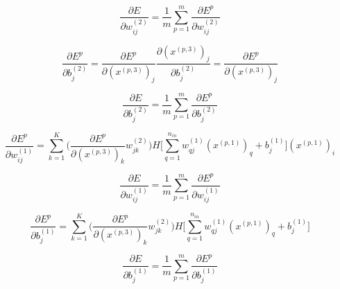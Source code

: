 \documentclass[a4paper,11pt,oneside,roman]{article}
\begin{document}
    \begin{equation}
        \frac{\partial E}{\partial w_{ij}^{(2)}} = \frac{1}{m} \sum\limits_{p=1}^{m} \frac{\partial E^p}{\partial w_{ij}^{(2)}}
    \end{equation}

    \begin{equation}
        \frac{\partial E^p}{\partial b_j^{(2)}} = \frac{\partial E^p}{\partial (x^{(p,3)})_{j}} \frac{\partial (x^{(p,3)})_{j}}{\partial b_{j}^{(2)}} = \frac{\partial E^p}{\partial (x^{(p,3)})_{j}}
    \end{equation}

    \begin{equation}
        \frac{\partial E}{\partial b_{j}^{(2)}} = \frac{1}{m} \sum\limits_{p=1}^{m} \frac{\partial E^p}{\partial b_{j}^{(2)}}
    \end{equation}

    \begin{equation}
        \frac{\partial E^p}{\partial w_{ij}^{(1)}} = \sum\limits_{k=1}^{K} \Big(\frac{\partial E^p}{\partial (x^{(p,3)})_k} w_{jk}^{(2)}\Big) H\big[\sum\limits_{q=1}^{n_{in}} w_{qj}^{(1)}(x^{(p,1)})_{q} + b_j^{(1)}\big] (x^{(p,1)})_i
    \end{equation}

    \begin{equation}
        \frac{\partial E}{\partial w_{ij}^{(1)}} = \frac{1}{m}\sum\limits_{p=1}^{m}\frac{\partial E^p}{\partial w_{ij}^{(1)}}
    \end{equation}

    \begin{equation}
        \frac{\partial E^p}{\partial b_j^{(1)}} = \sum\limits_{k=1}^{K} \Big(\frac{\partial E^p}{\partial (x^{(p,3)})_k} w_{jk}^{(2)}\Big) H\big[\sum\limits_{q=1}^{n_{in}} w_{qj}^{(1)}(x^{(p,1)})_{q} + b_j^{(1)}\big]
    \end{equation}

    \begin{equation}
        \frac{\partial E}{\partial b_j^{(1)}} = \frac{1}{m}\sum\limits_{p=1}^{m}\frac{\partial E^p}{\partial b_j^{(1)}}
    \end{equation}
\end{document}
